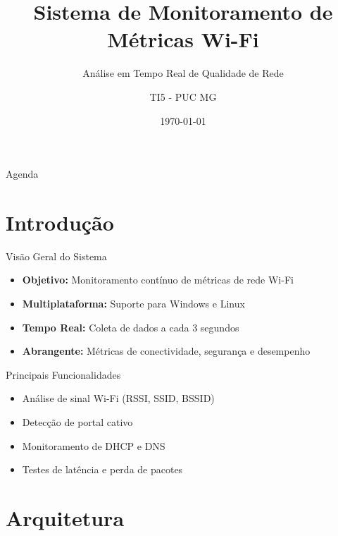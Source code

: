 \documentclass[aspectratio=169]{beamer}
\title{Sistema de Monitoramento de Métricas Wi-Fi}
\subtitle{Análise em Tempo Real de Qualidade de Rede}
\author{TI5 - PUC MG}
\date{\today}
\institute{5º Período - Ciência da Computação}
\begin{document}
\begin{frame}
\titlepage
\end{frame}

\begin{frame}{Agenda}
\tableofcontents
\end{frame}

\section{Introdução}

\begin{frame}{Visão Geral do Sistema}
\begin{itemize}
    \item \textbf{Objetivo:} Monitoramento contínuo de métricas de rede Wi-Fi
    \item \textbf{Multiplataforma:} Suporte para Windows e Linux
    \item \textbf{Tempo Real:} Coleta de dados a cada 3 segundos
    \item \textbf{Abrangente:} Métricas de conectividade, segurança e desempenho
\end{itemize}

\vspace{0.5cm}

\begin{block}{Principais Funcionalidades}
\begin{itemize}
    \item Análise de sinal Wi-Fi (RSSI, SSID, BSSID)
    \item Detecção de portal cativo
    \item Monitoramento de DHCP e DNS
    \item Testes de latência e perda de pacotes
\end{itemize}
\end{block}
\end{frame}

\section{Arquitetura}
\end{document}
